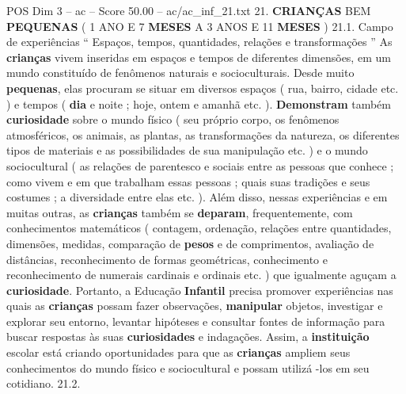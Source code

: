 \begin{textsample}{POS Dim 3 – ac – Score 50.00 – ac/ac\_inf\_21.txt}  \label{ex:f3_pos_025}
21. \textbf{CRIANÇAS} BEM \textbf{PEQUENAS} ( 1 ANO E 7 \textbf{MESES} A 3 ANOS E 11 \textbf{MESES} ) 21.1.
Campo de experiências “ Espaços, tempos, quantidades, relações e transformações ” As \textbf{crianças} vivem inseridas em espaços e tempos de diferentes dimensões, em um mundo constituído de fenômenos naturais e socioculturais.
Desde muito \textbf{pequenas}, elas procuram se situar em diversos espaços ( rua, bairro, cidade etc. ) e tempos ( \textbf{dia} e noite ; hoje, ontem e amanhã etc. ). \textbf{Demonstram} também \textbf{curiosidade} sobre o mundo físico ( seu próprio corpo, os fenômenos atmosféricos, os animais, as plantas, as transformações da natureza, os diferentes tipos de materiais e as possibilidades de sua manipulação etc. ) e o mundo sociocultural ( as relações de parentesco e sociais entre as pessoas que conhece ; como vivem e em que trabalham essas pessoas ; quais suas tradições e seus costumes ; a diversidade entre elas etc. ).
Além disso, nessas experiências e em muitas outras, as \textbf{crianças} também se \textbf{deparam}, frequentemente, com conhecimentos matemáticos ( contagem, ordenação, relações entre quantidades, dimensões, medidas, comparação de \textbf{pesos} e de comprimentos, avaliação de distâncias, reconhecimento de formas geométricas, conhecimento e reconhecimento de numerais cardinais e ordinais etc. ) que igualmente aguçam a \textbf{curiosidade}.
Portanto, a Educação \textbf{Infantil} precisa promover experiências nas quais as \textbf{crianças} possam fazer observações, \textbf{manipular} objetos, investigar e explorar seu entorno, levantar hipóteses e consultar fontes de informação para buscar respostas às suas \textbf{curiosidades} e indagações.
Assim, a \textbf{instituição} escolar está criando oportunidades para que as \textbf{crianças} ampliem seus conhecimentos do mundo físico e sociocultural e possam utilizá -los em seu cotidiano. 21.2.

\end{textsample}

